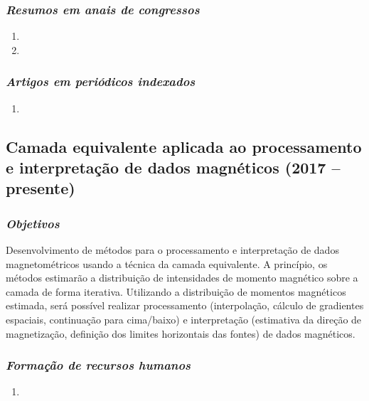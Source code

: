 \subsubsection{\emph{Resumos em anais de congressos}}

\begin{enumerate}
	\item {}
	\item {}
\end{enumerate}


\subsubsection{\emph{Artigos em periódicos indexados}}

\begin{enumerate}
	\item {}
	
\end{enumerate}

\subsection{Camada equivalente aplicada ao processamento e interpretação de dados magnéticos (2017 -- presente)} \label{projeto-guarda-chuva-eqlayer}

\subsubsection{\emph{Objetivos}}

Desenvolvimento de métodos para o processamento e interpretação de dados magnetométricos 
usando a técnica da camada equivalente. A princípio, os métodos estimarão a distribuição 
de intensidades de momento magnético sobre a camada de forma iterativa. Utilizando a 
distribuição de momentos magnéticos estimada, será possível realizar processamento 
(interpolação, cálculo de gradientes espaciais, continuação para cima/baixo) e 
interpretação (estimativa da direção de magnetização, definição dos limites horizontais 
das fontes) de dados magnéticos. 


\subsubsection{\emph{Formação de recursos humanos}}

\begin{enumerate}
	
	\item{}
	
\end{enumerate}

